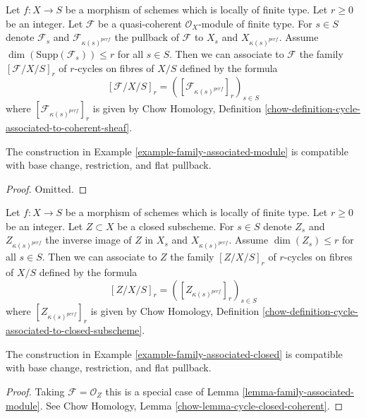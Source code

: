 \begin{example}
\label{example-family-associated-module}
Let $f : X \to S$ be a morphism of schemes which is locally of finite type.
Let $r \geq 0$ be an integer. Let $\mathcal{F}$ be a quasi-coherent
$\mathcal{O}_X$-module of finite type. For $s \in S$ denote $\mathcal{F}_s$
and $\mathcal{F}_{\kappa(s)^{perf}}$
the pullback of $\mathcal{F}$ to $X_s$ and $X_{\kappa(s)^{perf}}$.
Assume $\dim(\text{Supp}(\mathcal{F}_s)) \leq r$ for all $s \in S$.
Then we can associate to $\mathcal{F}$ the family $[\mathcal{F}/X/S]_r$ of
$r$-cycles on fibres of $X/S$ defined by the formula
$$
[\mathcal{F}/X/S]_r = ([\mathcal{F}_{\kappa(s)^{perf}}]_r)_{s \in S}
$$
where $[\mathcal{F}_{\kappa(s)^{perf}}]_r$ is given by
Chow Homology, Definition
\ref{chow-definition-cycle-associated-to-coherent-sheaf}.
\end{example}

\begin{lemma}
\label{lemma-family-associated-module}
The construction in Example \ref{example-family-associated-module}
is compatible with base change, restriction,
and flat pullback.
\end{lemma}

\begin{proof}
Omitted.
\end{proof}

\begin{example}
\label{example-family-associated-closed}
Let $f : X \to S$ be a morphism of schemes which is locally of finite type.
Let $r \geq 0$ be an integer. Let $Z \subset X$ be a closed subscheme.
For $s \in S$ denote $Z_s$ and $Z_{\kappa(s)^{perf}}$
the inverse image of $Z$ in $X_s$ and $X_{\kappa(s)^{perf}}$.
Assume $\dim(Z_s) \leq r$ for all $s \in S$.
Then we can associate to $Z$ the family $[Z/X/S]_r$
of $r$-cycles on fibres of $X/S$ defined by the formula
$$
[Z/X/S]_r = ([Z_{\kappa(s)^{perf}}]_r)_{s \in S}
$$
where $[Z_{\kappa(s)^{perf}}]_r$ is given by
Chow Homology, Definition
\ref{chow-definition-cycle-associated-to-closed-subscheme}.
\end{example}

\begin{lemma}
\label{lemma-family-associated-closed}
The construction in Example \ref{example-family-associated-closed}
is compatible with base change, restriction,
and flat pullback.
\end{lemma}

\begin{proof}
Taking $\mathcal{F} = \mathcal{O}_Z$ this is a special case of
Lemma \ref{lemma-family-associated-module}. See
Chow Homology, Lemma \ref{chow-lemma-cycle-closed-coherent}.
\end{proof}

